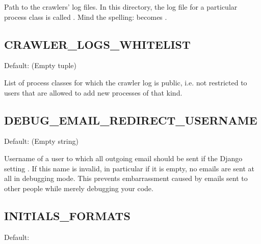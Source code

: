 \documentclass[a4paper,11pt,english]{sphinxmanual}
\begin{document}
Path to the crawlers' log files.  In this directory, the log file for a
particular process class is called .  Mind the
spelling:  becomes .


\subsection{CRAWLER\_LOGS\_WHITELIST}
\label{programming/settings:index-4}\label{programming/settings:crawler-logs-whitelist}
Default: \code{()} (Empty tuple)

List of process classes for which the crawler log is public, i.e. not
restricted to users that are allowed to add new processes of that kind.


\subsection{DEBUG\_EMAIL\_REDIRECT\_USERNAME}
\label{programming/settings:index-5}\label{programming/settings:debug-email-redirect-username}
Default:  (Empty string)

Username of a user to which all outgoing email should be sent if the Django
setting .  If this name is invalid, in particular if it is empty,
no emails are sent at all in debugging mode.  This prevents embarrassment
caused by emails sent to other people while merely debugging your code.


\subsection{INITIALS\_FORMATS}
\label{programming/settings:initials-formats}\label{programming/settings:index-6}\label{programming/settings:id1}
Default:
\end{document}
